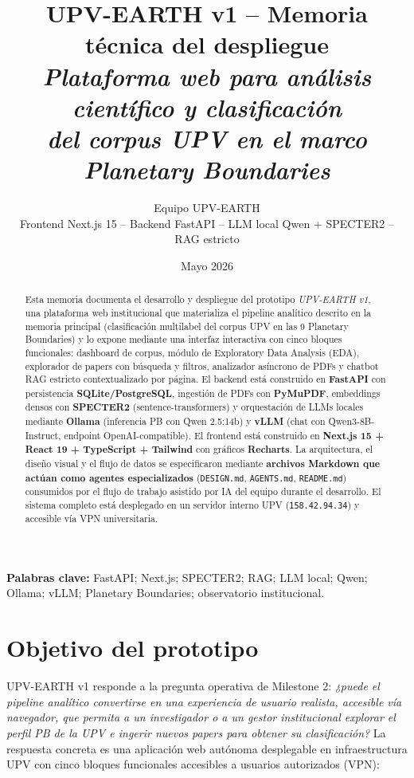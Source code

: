 \documentclass[11pt,a4paper]{article}
\title{\vspace*{-1.2cm}
\Large\bfseries\textcolor{accent}{UPV-EARTH v1 -- Memoria técnica del despliegue}\\[0.4em]
\large\textit{Plataforma web para análisis científico y clasificación\\
del corpus UPV en el marco Planetary Boundaries}}
\author{\normalsize Equipo UPV-EARTH \\
\small Frontend Next.js 15 -- Backend FastAPI -- LLM local Qwen + SPECTER2 -- RAG estricto}
\date{Mayo 2026}
\newcommand{\tech}[1]{\textbf{\textcolor{accent}{#1}}}
\newcommand{\file}[1]{\texttt{\small #1}}
\begin{document}
\maketitle
\thispagestyle{empty}
\vspace*{-1em}

\begin{abstract}
\noindent
Esta memoria documenta el desarrollo y despliegue del prototipo \emph{UPV-EARTH v1}, una plataforma web institucional que materializa el pipeline analítico descrito en la memoria principal (clasificación multilabel del corpus UPV en las 9 Planetary Boundaries) y lo expone mediante una interfaz interactiva con cinco bloques funcionales: dashboard de corpus, módulo de Exploratory Data Analysis (EDA), explorador de papers con búsqueda y filtros, analizador asíncrono de PDFs y chatbot RAG estricto contextualizado por página. El backend está construido en \tech{FastAPI} con persistencia \tech{SQLite/PostgreSQL}, ingestión de PDFs con \tech{PyMuPDF}, embeddings densos con \tech{SPECTER2} (sentence-transformers) y orquestación de LLMs locales mediante \tech{Ollama} (inferencia PB con Qwen 2.5:14b) y \tech{vLLM} (chat con Qwen3-8B-Instruct, endpoint OpenAI-compatible). El frontend está construido en \tech{Next.js 15 + React 19 + TypeScript + Tailwind} con gráficos \tech{Recharts}. La arquitectura, el diseño visual y el flujo de datos se especificaron mediante \textbf{archivos Markdown que actúan como agentes especializados} (\file{DESIGN.md}, \file{AGENTS.md}, \file{README.md}) consumidos por el flujo de trabajo asistido por IA del equipo durante el desarrollo. El sistema completo está desplegado en un servidor interno UPV (\texttt{158.42.94.34}) y accesible vía VPN universitaria.
\end{abstract}

\medskip
\noindent\textbf{Palabras clave:} FastAPI; Next.js; SPECTER2; RAG; LLM local; Qwen; Ollama; vLLM; Planetary Boundaries; observatorio institucional.

\tableofcontents
\clearpage

\section{Objetivo del prototipo}

UPV-EARTH v1 responde a la pregunta operativa de Milestone 2: \emph{¿puede el pipeline analítico convertirse en una experiencia de usuario realista, accesible vía navegador, que permita a un investigador o a un gestor institucional explorar el perfil PB de la UPV e ingerir nuevos papers para obtener su clasificación?} La respuesta concreta es una aplicación web autónoma desplegable en infraestructura UPV con cinco bloques funcionales accesibles a usuarios autorizados (VPN):
\end{document}
